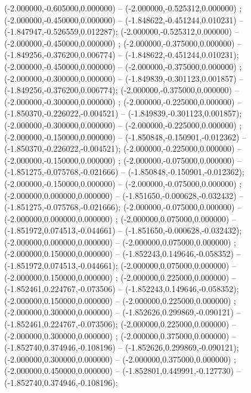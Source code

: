  (-2.000000,-0.605000,0.000000) -- (-2.000000,-0.525312,0.000000) ;
 (-2.000000,-0.450000,0.000000) -- (-1.848622,-0.451244,0.010231) -- (-1.847947,-0.526559,0.012287);
 (-2.000000,-0.525312,0.000000) -- (-2.000000,-0.450000,0.000000) ;
 (-2.000000,-0.375000,0.000000) -- (-1.849256,-0.376200,0.006774) -- (-1.848622,-0.451244,0.010231);
 (-2.000000,-0.450000,0.000000) -- (-2.000000,-0.375000,0.000000) ;
 (-2.000000,-0.300000,0.000000) -- (-1.849839,-0.301123,0.001857) -- (-1.849256,-0.376200,0.006774);
 (-2.000000,-0.375000,0.000000) -- (-2.000000,-0.300000,0.000000) ;
 (-2.000000,-0.225000,0.000000) -- (-1.850370,-0.226022,-0.004521) -- (-1.849839,-0.301123,0.001857);
 (-2.000000,-0.300000,0.000000) -- (-2.000000,-0.225000,0.000000) ;
 (-2.000000,-0.150000,0.000000) -- (-1.850848,-0.150901,-0.012362) -- (-1.850370,-0.226022,-0.004521);
 (-2.000000,-0.225000,0.000000) -- (-2.000000,-0.150000,0.000000) ;
 (-2.000000,-0.075000,0.000000) -- (-1.851275,-0.075768,-0.021666) -- (-1.850848,-0.150901,-0.012362);
 (-2.000000,-0.150000,0.000000) -- (-2.000000,-0.075000,0.000000) ;
 (-2.000000,0.000000,0.000000) -- (-1.851650,-0.000628,-0.032432) -- (-1.851275,-0.075768,-0.021666);
 (-2.000000,-0.075000,0.000000) -- (-2.000000,0.000000,0.000000) ;
 (-2.000000,0.075000,0.000000) -- (-1.851972,0.074513,-0.044661) -- (-1.851650,-0.000628,-0.032432);
 (-2.000000,0.000000,0.000000) -- (-2.000000,0.075000,0.000000) ;
 (-2.000000,0.150000,0.000000) -- (-1.852243,0.149646,-0.058352) -- (-1.851972,0.074513,-0.044661);
 (-2.000000,0.075000,0.000000) -- (-2.000000,0.150000,0.000000) ;
 (-2.000000,0.225000,0.000000) -- (-1.852461,0.224767,-0.073506) -- (-1.852243,0.149646,-0.058352);
 (-2.000000,0.150000,0.000000) -- (-2.000000,0.225000,0.000000) ;
 (-2.000000,0.300000,0.000000) -- (-1.852626,0.299869,-0.090121) -- (-1.852461,0.224767,-0.073506);
 (-2.000000,0.225000,0.000000) -- (-2.000000,0.300000,0.000000) ;
 (-2.000000,0.375000,0.000000) -- (-1.852740,0.374946,-0.108196) -- (-1.852626,0.299869,-0.090121);
 (-2.000000,0.300000,0.000000) -- (-2.000000,0.375000,0.000000) ;
 (-2.000000,0.450000,0.000000) -- (-1.852801,0.449991,-0.127730) -- (-1.852740,0.374946,-0.108196);
